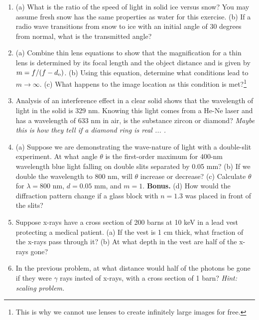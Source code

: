 \documentclass[12pt,twocolumn]{article}
\begin{document}
\begin{enumerate}
\item (a) What is the ratio of the speed of light in solid ice versus snow?  You may assume fresh snow has the same properties as water for this exercise. (b) If a radio wave transitions from snow to ice with an initial angle of 30 degrees from normal, what is the transmitted angle? \\ \vspace{3cm}
\item (a) Combine thin lens equations to show that the magnification for a thin lens is determined by its focal length and the object distance and is given by $m=f/(f - d_{\rm o})$. (b) Using this equation, determine what conditions lead to $m \to \infty$. (c) What happens to the image location as this condition is met?\footnote{This is why we cannot use lenses to create infinitely large images for free.} \\ \vspace{3cm}
\item Analysis of an interference effect in a clear solid shows that the wavelength of light in the solid is 329 nm. Knowing this light comes from a He-Ne laser and has a wavelength of 633 nm in air, is the substance zircon or diamond? \textit{Maybe this is how they tell if a diamond ring is real ... .}\\ \vspace{1cm}
\item (a) Suppose we are demonstrating the wave-nature of light with a double-slit experiment.  At what angle $\theta$ is the first-order maximum for 400-nm wavelength blue light falling on double slits separated by 0.05 mm? (b) If we double the wavelength to 800 nm, will $\theta$ increase or decrease? (c) Calculate $\theta$ for $\lambda = 800$ nm, $d = 0.05$ mm, and $m = 1$.  \textbf{Bonus.} (d) How would the diffraction pattern change if a glass block with $n = 1.3$ was placed in front of the slits? \\ \vspace{2.5cm}
\item Suppose x-rays have a cross section of 200 barns at 10 keV in a lead vest protecting a medical patient. (a) If the vest is 1 cm thick, what fraction of the x-rays pass through it? (b) At what depth in the vest are half of the x-rays gone? \\ \vspace{2cm}
\item In the previous problem, at what distance would half of the photons be gone if they were $\gamma$ rays insted of x-rays, with a cross section of 1 barn?  \textit{Hint: scaling problem.} \\ \vspace{2cm}

\end{enumerate}
\end{document}

